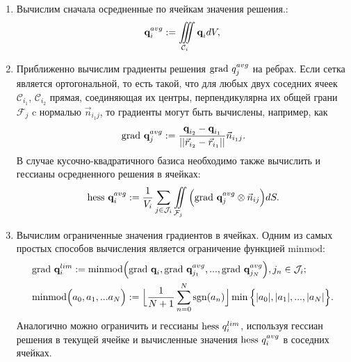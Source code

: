 \documentclass[14pt, a4paper, fleqn]{extreport}
\begin{document}
	\begin{enumerate}
	
	\item 
	Вычислим сначала осредненные по ячейкам значения решения.:
	\begin{equation*}
		\textbf{q}_i^{avg} := \iiint\limits_{\mathcal{C}_i} \textbf{q}_i dV, \\
	\end{equation*}
	
	\item 
	Приближенно вычислим градиенты решения $\text{grad }{q}_j^{avg}$ на ребрах.
	Если сетка является ортогональной, то есть такой, что для любых двух соседних
	ячеек $\mathcal{C}_{i_1}$, $\mathcal{C}_{i_2}$ прямая, соединяющая их центры, 
	перпендикулярна их общей грани $\mathcal{F}_j$ c нормалью $\vec{n}_{i_1 j}$, 
	то градиенты могут быть вычислены, например, как
	\begin{equation*}
		\text{grad }{\textbf{q}}_j^{avg} 
			:= \dfrac{\textbf{q}_{i_2} - \textbf{q}_{i_1}}{||\vec{r}_{i_2} - \vec{r}_{i_1}||}\vec{n}_{i_1 j}.
	\end{equation*}
 	В случае кусочно-квадратичного базиса необходимо также вычислить и 
 	гессианы осредненного решения в ячейках:
	\begin{equation*}
		\text{hess }{\textbf{q}}_i^{avg} 
			:= \dfrac{1}{V_i} \sum\limits_{j \in \mathcal{J}_i}\iint\limits_{\mathcal{F}_j} 
				\Big( \text{grad }{\textbf{q}}_j^{avg} \otimes \vec{n}_{ij} \Big) dS.
	\end{equation*}
	
	\item
	Вычислим ограниченные значения градиентов в ячейках.
	Одним из самых простых способов вычисления является ограничение функцией $\text{minmod}$:
	\begin{equation*}
	\begin{split}
		&\text{grad }{\textbf{q}}_i^{lim} 
			:= \text{minmod}\Big( \text{grad }{\textbf{q}_i}, \text{grad }{\textbf{q}}_{j_1}^{avg}, ..., \text{grad }{\textbf{q}}_{j_N}^{avg} \Big), 
				j_n \in \mathcal{J}_i; \\
		&\text{minmod}\Big(a_0,a_1,...a_N\Big) 
			:= \Big\lfloor \dfrac{1}{N+1}\sum\limits_{n=0}^N \text{sgn}(a_n) \Big\rfloor
				\min\Big\lbrace |a_0|,|a_1|,...,|a_N| \Big\rbrace.
	\end{split}
	\end{equation*}
	Аналогично можно ограничить и гессианы $\text{hess }{q}_i^{lim}$, используя гессиан решения в текущей ячейке
	и вычисленные значения $\text{hess }{q}_i^{avg}$ в соседних ячейках.
		

\end{enumerate}
\end{document}
